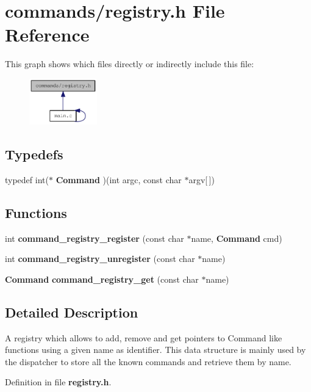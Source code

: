\section{commands/registry.h File Reference}
\label{dc/d40/commands_2registry_8h}
This graph shows which files directly or indirectly include this file:\nopagebreak
\begin{figure}[H]
\begin{center}
\leavevmode
\includegraphics[width=83pt]{d8/d06/commands_2registry_8h__dep__incl}
\end{center}
\end{figure}
\subsection*{Typedefs}
\begin{DoxyCompactItemize}
\item 
typedef int($\ast$ {\bf Command} )(int argc, const char $\ast$argv[$\,$])
\end{DoxyCompactItemize}
\subsection*{Functions}
\begin{DoxyCompactItemize}
\item 
int {\bf command\_\-registry\_\-register} (const char $\ast$name, {\bf Command} cmd)
\item 
int {\bf command\_\-registry\_\-unregister} (const char $\ast$name)
\item 
{\bf Command} {\bf command\_\-registry\_\-get} (const char $\ast$name)
\end{DoxyCompactItemize}


\subsection{Detailed Description}
A registry which allows to add, remove and get pointers to Command like functions using a given name as identifier. This data structure is mainly used by the dispatcher to store all the known commands and retrieve them by name. 

Definition in file {\bf registry.h}.



